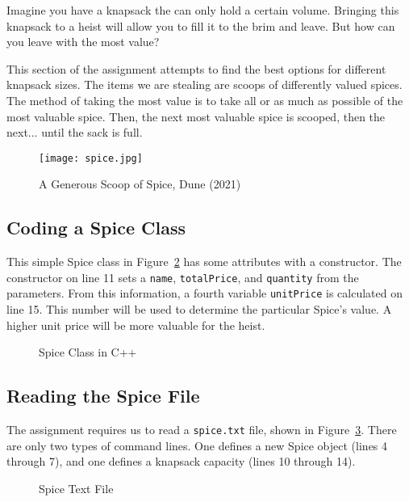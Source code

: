 \documentclass[letterpaper, 10pt,DIV=13]{scrartcl}
\numberwithin{equation}{section} %
\numberwithin{figure}{section} %
\numberwithin{table}{section} %
\begin{document}
Imagine you have a knapsack the can only hold a certain volume. Bringing this knapsack to a heist will allow you to fill it to the brim and leave. But how can you leave with the most value?

This section of the assignment attempts to find the best options for different knapsack sizes. The items we are stealing are scoops of differently valued spices. The method of taking the most value is to take all or as much as possible of the most valuable spice. Then, the next most valuable spice is scooped, then the next... until the sack is full.

\begin{figure}[h] 
    \centering 
    \texttt{[image: spice.jpg]}
    \caption{A Generous Scoop of Spice, Dune (2021)\footnotemark}
    \label{figure:DuneSpice}
    
\end{figure}

\pagebreak

\subsection{Coding a Spice Class}
This simple Spice class in Figure~\ref{figure:SpiceClass} has some attributes with a constructor. The constructor on line 11 sets a \texttt{name}, \texttt{totalPrice}, and \texttt{quantity} from the parameters. From this information, a fourth variable \texttt{unitPrice} is calculated on line 15. This number will be used to determine the particular Spice's value. A higher unit price will be more valuable for the heist.

\begin{figure}[ht] 
    \centering 
    
    \caption{Spice Class in C++}
    \label{figure:SpiceClass}
\end{figure}

\subsection{Reading the Spice File}
The assignment requires us to read a \texttt{spice.txt} file, shown in Figure~\ref{figure:SpiceTEXT}. There are only two types of command lines. One defines a new Spice object (lines 4 through 7), and one defines a knapsack capacity (lines 10 through 14).


\begin{figure}[ht] 
    \centering 
    
    \caption{Spice Text File}
    \label{figure:SpiceTEXT}
\end{figure}
\end{document}
